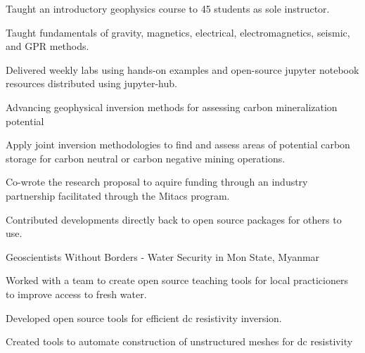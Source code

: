 \begin{cventries}
{\begin{cvitems}
        \item {Taught an introductory geophysics course to 45 students as sole instructor.}
        \item {Taught fundamentals of gravity, magnetics, electrical, electromagnetics, seismic, and GPR methods.}
        \item {Delivered weekly labs using hands-on examples and open-source jupyter notebook resources distributed using jupyter-hub.}
        \vspace{10pt}
      \end{cvitems}
      \begin{cvparagraph}
      \vspace{7pt}
      Advancing geophysical inversion methods for assessing carbon mineralization potential
      \vspace{7pt}
      \end{cvparagraph}
      \begin{cvitems}
        \item {Apply joint inversion methodologies to find and assess areas of potential carbon storage for carbon neutral or carbon negative mining operations.}
        \item {Co-wrote the research proposal to aquire funding through an industry partnership facilitated through the Mitacs program.}
        \item {Contributed developments directly back to open source packages for others to use.}
        \vspace{10pt}
      \end{cvitems}
      \begin{cvparagraph}
      \vspace{7pt}
      Geoscientists Without Borders - Water Security in Mon State, Myanmar
      \vspace{7pt}
      \end{cvparagraph}
      \begin{cvitems}
        \item {Worked with a team to create open source teaching tools for local practicioners to improve access to fresh water.}
        \item {Developed open source tools for efficient dc resistivity inversion.}
        \item {Created tools to automate construction of unstructured meshes for dc resistivity}
        \vspace{10pt}
      \end{cvitems}}

\end{cventries}
